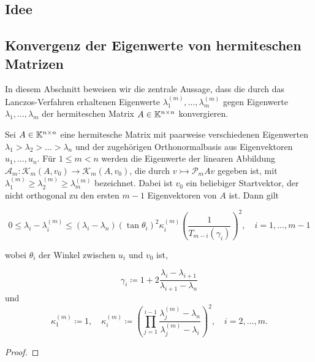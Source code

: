 \documentclass{article}
\begin{document}
\subsection{Idee}

\subsection{Konvergenz der Eigenwerte von hermiteschen Matrizen}

In diesem Abschnitt beweisen wir die zentrale Aussage, dass die durch das Lanczos-Verfahren erhaltenen Eigenwerte $\lambda_1^{(m)},\dots,\lambda_m^{(m)}$ gegen Eigenwerte $\lambda_1,\dots,\lambda_m$ der hermiteschen Matrix $A \in \mathbb{K}^{n \times n}$ konvergieren.



\begin{theorem}
	Sei $A \in \mathbb{K}^{n \times n}$ eine hermitesche Matrix mit paarweise verschiedenen Eigenwerten $\lambda_1 > \lambda_2 > \dots > \lambda_n$ und der zugehörigen Orthonormalbasis aus Eigenvektoren $u_1,\dots,u_n$. Für $1 \le m < n$ werden die Eigenwerte der linearen Abbildung $\mathcal{A}_m: \mathcal{K}_m(A,v_0)\rightarrow \mathcal{K}_m(A,v_0)$, die durch $v \rightarrowtail \mathcal{P}_mAv$ gegeben ist,  mit $\lambda_1^{(m)} \ge \lambda_2^{(m)} \ge \lambda_m^{(m)}$ bezeichnet. Dabei ist $v_0$ ein beliebiger Startvektor, der nicht orthogonal zu den ersten $m-1$ Eigenvektoren von $A$ ist. Dann gilt
	
	\begin{equation}
		\label{konvergenz Eigenwerte}
		0 \le \lambda_i - \lambda_i^{(m)} \le (\lambda_i -\lambda_n) (\tan\theta_i)^2 \kappa_i^{(m)} \left(\frac{1}{T_{m-i}(\gamma_i)}\right)^2, \quad i=1,\dots,m-1
	\end{equation}

	wobei $\theta_i$ der Winkel zwischen $u_i$ und $v_0$ ist,
	
	\begin{equation*}
		\gamma_i \coloneqq 1+2 \frac{\lambda_i-\lambda_{i+1}}{\lambda_{i+1} -\lambda_n}
	\end{equation*}
und 
	\begin{equation*}
		\kappa_1^{(m)} \coloneqq 1, \quad \kappa_i^{(m)} \coloneqq \left(\prod_{j=1}^{i-1} \frac{\lambda_j^{(m)} - \lambda_n}{\lambda_j^{(m)} - \lambda_i}\right)^2, \quad i = 2,\dots,m.
	\end{equation*}
	
	\begin{proof}
		

\end{proof}
\end{theorem}
\end{document}
